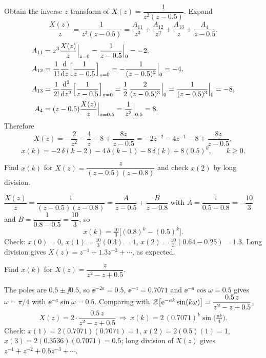 \begin{example}
Obtain the inverse $z$ transform of $X(z)=\dfrac{1}{z^{2}(z-0.5)}$. Expand
\[
  \frac{X(z)}{z}=\frac{1}{z^{3}(z-0.5)}=\frac{A_{11}}{z^{3}}+\frac{A_{12}}{z^{2}}+\frac{A_{13}}{z}+\frac{A_4}{z-0.5}.
\]
\begin{align*}
  A_{11}&=z^{3}\frac{X(z)}{z}\Big|_{z=0}=\frac{1}{z-0.5}\Big|_{0}=-2,\\
  A_{12}&=\frac{1}{1!}\frac{\mathrm{d}}{\mathrm{d} z}\Bigl[\frac{1}{z-0.5}\Bigr]_{z=0}=-\frac{1}{(z-0.5)^{2}}\Big|_{0}=-4,\\
  A_{13}&=\frac{1}{2!}\frac{\mathrm{d}^{2}}{\mathrm{d} z^{2}}\Bigl[\frac{1}{z-0.5}\Bigr]_{z=0}=\frac12\,\frac{2}{(z-0.5)^{3}}\Big|_{0}=\frac{1}{(z-0.5)^{3}}\Big|_{0}=-8,\\
  A_{4}&=(z-0.5)\frac{X(z)}{z}\Big|_{z=0.5}=\frac{1}{z^{3}}\Big|_{0.5}=8.
\end{align*}
Therefore
\[
  X(z)=-\frac{2}{z^{2}}-\frac{4}{z}-8+\frac{8z}{z-0.5}=-2z^{-2}-4z^{-1}-8+\frac{8z}{z-0.5},
\]
\[
  x(k)=-2\,\delta(k-2)-4\,\delta(k-1)-8\,\delta(k)+8(0.5)^{k},\qquad k\ge0.
\]
\end{example}

\begin{problem}
Find $x(k)$ for $X(z)=\dfrac{z}{(z-0.5)(z-0.8)}$ and check $x(2)$ by long division.
\end{problem}
\begin{solution}
$\dfrac{X(z)}{z}=\dfrac{1}{(z-0.5)(z-0.8)}=\dfrac{A}{z-0.5}+\dfrac{B}{z-0.8}$ with
$A=\dfrac{1}{0.5-0.8}=-\dfrac{10}{3}$ and $B=\dfrac{1}{0.8-0.5}=\dfrac{10}{3}$, so
\[
  x(k)=\tfrac{10}{3}\bigl[(0.8)^{k}-(0.5)^{k}\bigr].
\]
Check: $x(0)=0$, $x(1)=\tfrac{10}{3}(0.3)=1$, $x(2)=\tfrac{10}{3}(0.64-0.25)=1.3$. Long division gives
$X(z)=z^{-1}+1.3z^{-2}+\cdots$, as expected.
\end{solution}

\begin{problem}
Find $x(k)$ for $X(z)=\dfrac{z}{z^{2}-z+0.5}$.
\end{problem}
\begin{solution}
The poles are $0.5\pm\jj0.5$, so $\ee^{-2a}=0.5$, $\ee^{-a}=0.7071$ and $\ee^{-a}\cos\omega=0.5$ gives
$\omega=\pi/4$ with $\ee^{-a}\sin\omega=0.5$. Comparing with $\mathcal{Z}\!\left[\mathrm{e}^{-ak}\sin(k\omega)\right]=\dfrac{0.5\,z}{z^{2}-z+0.5}$,
\[
  X(z)=2\cdot\frac{0.5\,z}{z^{2}-z+0.5}\ \Rightarrow\ x(k)=2\,(0.7071)^{k}\sin\!\bigl(\tfrac{\pi k}{4}\bigr).
\]
Check: $x(1)=2(0.7071)(0.7071)=1$, $x(2)=2(0.5)(1)=1$, $x(3)=2(0.3536)(0.7071)=0.5$; long division of $X(z)$
gives $z^{-1}+z^{-2}+0.5z^{-3}+\cdots$.
\end{solution}

